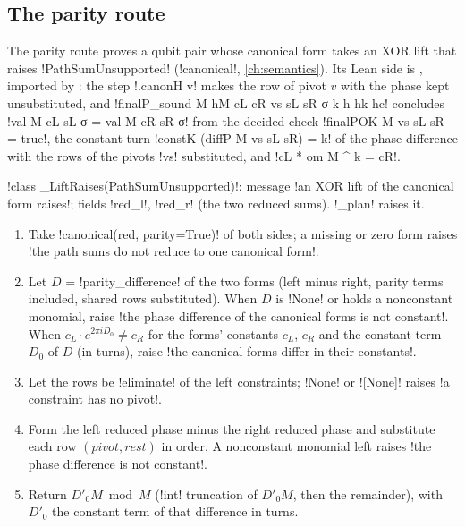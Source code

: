 {{{\subsection{The parity route}\label{sec:lean-export-parity}

The parity route proves a qubit pair whose canonical form takes an XOR lift that raises
\lexpy!PathSumUnsupported! (\lexpy!canonical!, \cref{ch:semantics}). Its Lean side is
, imported by : the step
\lexlean!.canonH v! makes the row of pivot $v$ with the phase kept unsubstituted, and
\lexlean!finalP_sound M hM cL cR vs sL sR σ k h hk hc! concludes \lexlean!val M cL sL σ = val M cR sR σ!
from the decided check \lexlean!finalPOK M vs sL sR = true!, the constant turn
\lexlean!constK (diffP M vs sL sR) = k! of the phase difference with the rows of the pivots
\lexcode!vs! substituted, and \lexlean!cL * om M ^ k = cR!.

\begin{signature}
\lexpy!class _LiftRaises(PathSumUnsupported)!: message \lexcode!an XOR lift of the canonical form raises!;
fields \lexpy!red_l!, \lexpy!red_r! (the two reduced sums). \lexpy!_plan! raises it.
\end{signature}

\begin{algorithm}\label{alg:lean-export-parity-turn}
\begin{enumerate}
\item Take \lexpy!canonical(red, parity=True)! of both sides; a missing or zero form raises
\lexcode!the path sums do not reduce to one canonical form!.
\item Let $D$ = \lexpy!parity_difference! of the two forms (left minus right, parity terms
included, shared rows substituted). When $D$ is \lexpy!None! or holds a nonconstant monomial,
raise \lexcode!the phase difference of the canonical forms is not constant!. When
$c_L\cdot e^{2\pi i D_0} \neq c_R$ for the forms' constants $c_L$, $c_R$ and the constant term
$D_0$ of $D$ (in turns), raise \lexcode!the canonical forms differ in their constants!.
\item Let the rows be \lexpy!eliminate! of the left constraints; \lexpy!None! or \lexpy![None]! raises
\lexcode!a constraint has no pivot!.
\item Form the left reduced phase minus the right reduced phase and substitute each row
$(\mathit{pivot}, \mathit{rest})$ in order. A nonconstant monomial left raises
\lexcode!the phase difference is not constant!.
\item Return $D'_0 M \bmod M$ (\lexpy!int! truncation of $D'_0 M$, then the remainder), with
$D'_0$ the constant term of that difference in turns.
\end{enumerate}
\end{algorithm}

}}}
